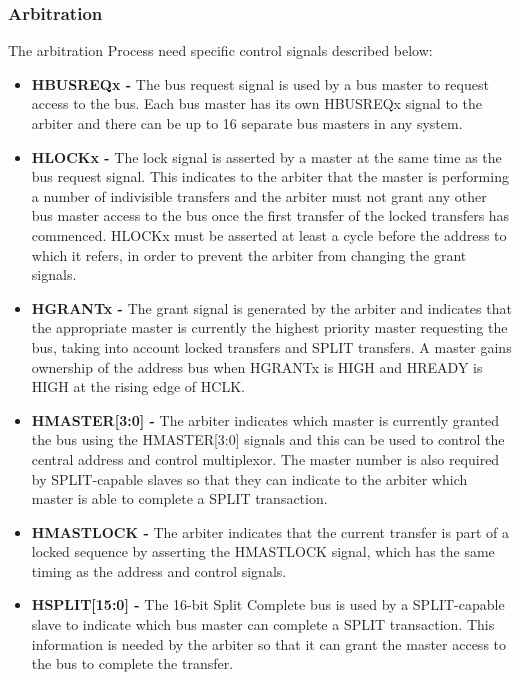 \subsubsection{Arbitration}
 The arbitration Process  need specific control signals described  below:
 \begin{itemize}
\item  {\textbf{HBUSREQx -}} The bus request signal is used by a bus master to request access to the bus. Each bus master has its own HBUSREQx signal to the arbiter and there can be up to 16 separate bus masters in any system.
\item  {\textbf{HLOCKx -}} The lock signal is asserted by a master at the same time as the bus request signal. This indicates to the arbiter that the master is performing a number of indivisible transfers and the arbiter must not grant any other bus master access to the bus once the first transfer of the locked transfers has commenced. HLOCKx must be asserted at least a cycle before the address to which it refers, in order to prevent the arbiter from changing the grant signals.
\item  {\textbf{HGRANTx -}} The grant signal is generated by the arbiter and indicates that the appropriate master is currently the highest priority master requesting the bus, taking into account locked transfers and SPLIT transfers.
A master gains ownership of the address bus when HGRANTx is HIGH and HREADY is HIGH at the rising edge of HCLK.
\item  {\textbf{HMASTER[3:0] -}} The arbiter indicates which master is currently granted the bus using the HMASTER[3:0] signals and this can be used to control the central address and control multiplexor. The master number is also required by SPLIT-capable slaves so that they can indicate to the arbiter which master is able to complete a SPLIT transaction.
\item  {\textbf{HMASTLOCK -}} The arbiter indicates that the current transfer is part of a locked sequence by asserting the HMASTLOCK signal, which has the same timing as the address and control signals.

\item  {\textbf{HSPLIT[15:0] -}} The 16-bit Split Complete bus is used by a SPLIT-capable slave to indicate which bus master can complete a SPLIT transaction. This information is needed by the arbiter so that it can grant the master access to the bus to complete the transfer.
\end{itemize}

